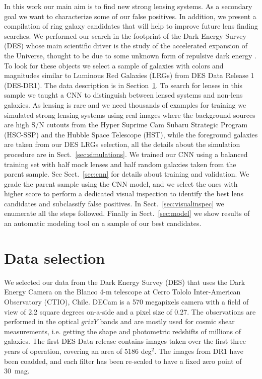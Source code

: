 \documentclass[tradiabstract,twocolumn]{aa}
\begin{document}
In this work our main aim is to find new strong lensing systems. As a secondary goal we want to characterize some of our false positives. In addition, we present a compilation of ring galaxy candidates that will help to improve future lens finding searches. We performed our search in the footprint of the Dark Energy Survey (DES) whose main scientific driver is the study of the accelerated expansion of the Universe, thought to be due to some unknown form of repulsive dark energy \citep{DES2005}. To look for these objects we select a sample of galaxies with colors and magnitudes similar to Luminous Red Galaxies (LRGs) from DES Data Release 1 (DES-DR1). The data description is in Section~\ref{sec:datasel}. To search for lenses in this sample we taught a CNN to distinguish between lensed systems and non-lens galaxies. As lensing is rare and we need thousands of examples for training we simulated strong lensing systems using real images where the background sources are high S/N cutouts from the Hyper Suprime Cam Subaru Strategic Program (HSC-SSP) and the Hubble Space Telescope (HST), while the foreground galaxies are taken from our DES LRGs selection, all the details about the simulation procedure are in Sect.~\ref{sec:simulations}. We trained our CNN using a balanced training set with half mock lenses and half random galaxies taken from the parent sample. See Sect.~\ref{sec:cnn} for details about training and validation. We grade the parent sample using the CNN model, and we select the ones with higher score to perform a dedicated visual inspection to identify the best lens candidates and subclassify false positives. In Sect.~\ref{sec:visualinspec} we enumerate all the steps followed. Finally in Sect.~\ref{sec:model} we show results of an automatic modeling tool on a sample of our best candidates. 



\section{Data selection}\label{sec:datasel}

We selected our data from the Dark Energy Survey (DES) that uses the Dark Energy Camera \citep[DECam,][]{Honscheid2008,Flaugher2015} on the Blanco 4-m telescope at Cerro Tololo Inter-American Observatory (CTIO), Chile. DECam is a 570 megapixels camera with a field of view of 2.2 square degrees on-a-side and a pixel size of 0.27\arcsec. The observations are performed in the optical $grizY$ bands and are mostly used for cosmic shear measurements, i.e. getting the shape and photometric redshifts of millions of galaxies. The first DES Data release \citep[DES-DR1,][]{Abbott2018} contains images taken over the first three years of operation, covering an area of 5186 deg$^{2}$. The images from DR1 have been coadded, and each filter has been re-scaled to have a fixed zero point of 30~mag.
\end{document}
